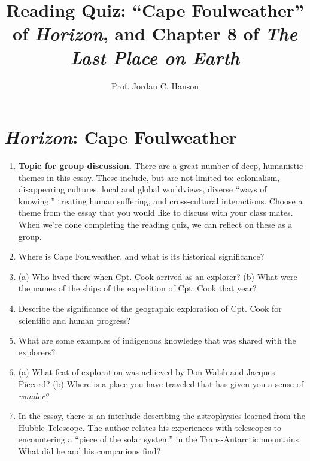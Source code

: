 \documentclass{article}
\begin{document}
\twocolumn

\title{Reading Quiz: ``Cape Foulweather'' of \textit{Horizon}, and Chapter 8 of \textit{The Last Place on Earth}}
\author{Prof. Jordan C. Hanson}

\maketitle

\section{\textit{Horizon}: Cape Foulweather}

\begin{enumerate}
\item \textbf{Topic for group discussion.} There are a great number of deep, humanistic themes in this essay.  These include, but are not limited to: colonialism, disappearing cultures, local and global worldviews, diverse ``ways of knowing,'' treating human suffering, and cross-cultural interactions.  Choose a theme from the essay that you would like to discuss with your class mates. When we're done completing the reading quiz, we can reflect on these as a group.
\item Where is Cape Foulweather, and what is its historical significance? \\ \vspace{1cm}
\item (a) Who lived there when Cpt. Cook arrived as an explorer? (b) What were the names of the ships of the expedition of Cpt. Cook that year? \\ \vspace{1cm}
\item Describe the significance of the geographic exploration of Cpt. Cook for scientific and human progress? \\ \vspace{1cm}
\item What are some examples of indigenous knowledge that was shared with the explorers? \\ \vspace{2cm}
\item (a) What feat of exploration was achieved by Don Walsh and Jacques Piccard? (b) Where is a place you have traveled that has given you a sense of \textit{wonder?} \\ \vspace{2cm}
\item In the essay, there is an interlude describing the astrophysics learned from the Hubble Telescope.  The author relates his experiences with telescopes to encountering a ``piece of the solar system'' in the Trans-Antarctic mountains.  What did he and his companions find? \\ \vspace{2cm}

\end{enumerate}
\end{document}
